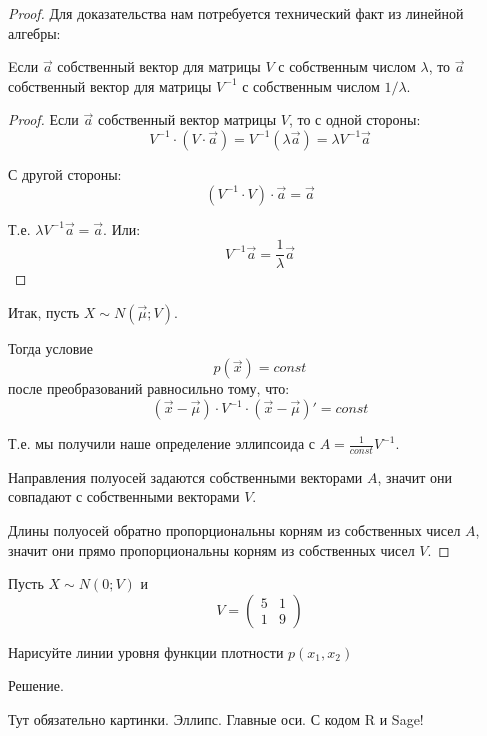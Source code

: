 \begin{proof}

Для доказательства нам потребуется технический факт из линейной алгебры:
\begin{myth}
Eсли $\vec{a}$ собственный вектор для матрицы $V$ с собственным числом $\lambda$, то $\vec{a}$ собственный вектор для матрицы $V^{-1}$ с собственным числом $1/\lambda$.
\end{myth}
\begin{proof}
Если $\vec{a}$ собственный вектор матрицы $V$, то с одной стороны:
\begin{equation}
V^{-1}\cdot (V\cdot \vec{a})=V^{-1} (\lambda \vec{a})=\lambda V^{-1}\vec{a}
\end{equation}

С другой стороны:
\begin{equation}
(V^{-1}\cdot V)\cdot \vec{a}=\vec{a}
\end{equation}

Т.е. $\lambda V^{-1}\vec{a}=\vec{a}$. Или:
\begin{equation}
V^{-1}\vec{a}=\frac{1}{\lambda}\vec{a}
\end{equation}

\end{proof}


Итак, пусть $X\sim N(\vec{\mu};V)$.

Тогда условие
\begin{equation}
p(\vec{x})=const
\end{equation}
после преобразований равносильно тому, что:
\begin{equation}
(\vec{x}-\vec{\mu})\cdot V^{-1}\cdot (\vec{x}-\vec{\mu})'=const
\end{equation}

Т.е. мы получили наше определение эллипсоида с $A=\frac{1}{const}V^{-1}$.

Направления полуосей задаются собственными векторами $A$, значит они совпадают с собственными векторами $V$. 

Длины полуосей обратно пропорциональны корням из собственных чисел $A$, значит они прямо пропорциональны корням из собственных чисел $V$.
\end{proof}


\begin{myex}
Пусть $X\sim N(0;V)$ и 
\begin{equation}
V=
\left(
\begin{array}{cc}
5 & 1 \\ 
1 & 9
\end{array} 
\right)
\end{equation}

Нарисуйте линии уровня функции плотности $p(x_{1},x_{2})$


Решение.

Тут обязательно картинки. Эллипс. Главные оси. С кодом R и Sage!

\end{myex}


